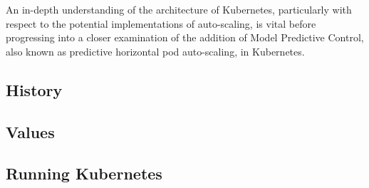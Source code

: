 An in-depth understanding of the architecture of Kubernetes, particularly with
respect to the potential implementations of auto-scaling, is vital before
progressing into a closer examination of the addition of Model Predictive
Control, also known as predictive horizontal pod auto-scaling, in Kubernetes.

\subsection{History}



\subsection{Values}



\subsection{Running Kubernetes}


